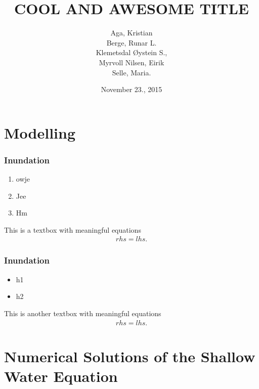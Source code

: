 \documentclass[screen]{beamer}
\title[Eksempelforedrag]%
{COOL AND AWESOME TITLE}
\author[aut]{Aga, Kristian \\ Berge, Runar L. \\ Klemetsdal Øystein S.,\\
	Myrvoll Nilsen, Eirik \\ Selle, Maria.
}
\date{November 23., 2015}
\begin{document}
\ntnutitlepage

\section*{Modelling}
\begin{frame}
    \frametitle[jaddA]{Inundation}
    \begin{enumerate}[\label = $\circ$]
        \item    owje
        \item    Jee
        \item    Hm
    \end{enumerate}
    \begin{block}{This is a textbox with meaningful equations}
        \begin{align*}
            rhs = lhs.
        \end{align*}
    \end{block}
\end{frame}

\begin{frame}
    \frametitle{Inundation}
    \begin{itemize}
        \pause
        \item    h1
        \pause
        \item    h2    
    \end{itemize}
    \pause
    \begin{block}{This is another textbox with meaningful equations}
        \begin{align*}
            rhs = lhs.
        \end{align*}
    \end{block}
\end{frame}

\section*{Numerical Solutions of the Shallow Water Equation}
\end{document}
